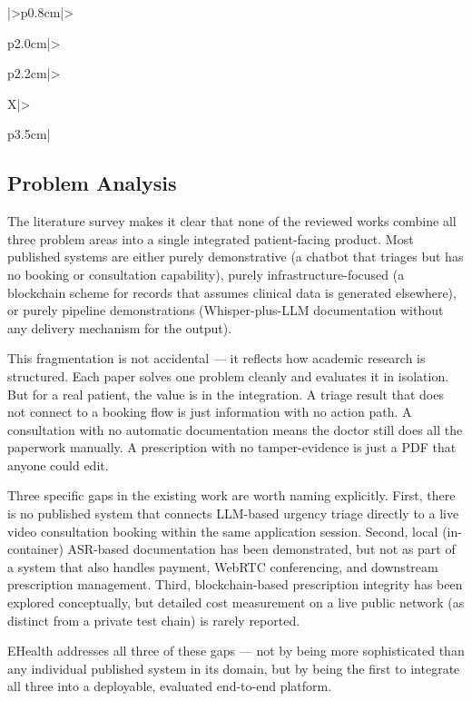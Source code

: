 {\begin{xltabular}{\textwidth}{|>{\centering\arraybackslash}p{0.8cm}|>{\raggedright\arraybackslash}p{2.0cm}|>{\raggedright\arraybackslash}p{2.2cm}|>{\raggedright\arraybackslash}X|>{\raggedright\arraybackslash}p{3.5cm}|}
\end{xltabular}
}
\subsection{Problem Analysis}

The literature survey makes it clear that none of the reviewed works combine all three problem areas into a single integrated patient-facing product. Most published systems are either purely demonstrative (a chatbot that triages but has no booking or consultation capability), purely infrastructure-focused (a blockchain scheme for records that assumes clinical data is generated elsewhere), or purely pipeline demonstrations (Whisper-plus-LLM documentation without any delivery mechanism for the output).

\noindent This fragmentation is not accidental --- it reflects how academic research is structured. Each paper solves one problem cleanly and evaluates it in isolation. But for a real patient, the value is in the integration. A triage result that does not connect to a booking flow is just information with no action path. A consultation with no automatic documentation means the doctor still does all the paperwork manually. A prescription with no tamper-evidence is just a PDF that anyone could edit.

\noindent Three specific gaps in the existing work are worth naming explicitly. First, there is no published system that connects LLM-based urgency triage directly to a live video consultation booking within the same application session. Second, local (in-container) ASR-based documentation has been demonstrated, but not as part of a system that also handles payment, WebRTC conferencing, and downstream prescription management. Third, blockchain-based prescription integrity has been explored conceptually, but detailed cost measurement on a live public network (as distinct from a private test chain) is rarely reported.

\noindent EHealth addresses all three of these gaps --- not by being more sophisticated than any individual published system in its domain, but by being the first to integrate all three into a deployable, evaluated end-to-end platform.

\vspace{5mm}

